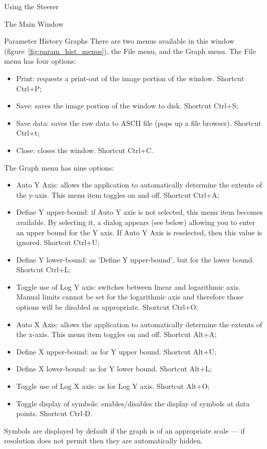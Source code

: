 \documentclass[a4paper,twoside]{article}
\begin{document}
\begin{section}{Using the Steerer}
\begin{subsection}{The Main Window}
\begin{subsubsection}{Parameter History Graphs}
There are two menus available in this window
(figure~\ref{fig:param_hist_menus}), the File menu, and the Graph
menu. The File menu has four options:
\begin{itemize}
\item Print: requests a print-out of the image portion of the window. 
Shortcut Ctrl+P;
\item Save: saves the image portion of the window to disk. Shortcut Ctrl+S;
\item Save data: saves the raw data to ASCII file (pops up a file browser). 
Shortcut Ctrl+t;
\item Close: closes the window. Shortcut Ctrl+C.
\end{itemize}
The Graph menu has nine options:
\begin{itemize}
\item Auto Y Axis: allows the application to automatically determine 
the extents of the y-axis. This menu item toggles on and off. 
Shortcut Ctrl+A;
\item Define Y upper-bound: if Auto Y axis is not selected, this 
menu item becomes available. By selecting it, a dialog appears 
(see below) allowing you to enter an upper bound for the Y axis. 
If Auto Y Axis is reselected, then this value is ignored. 
Shortcut Ctrl+U;
\item Define Y lower-bound: as 'Define Y upper-bound', but for 
the lower bound. Shortcut Ctrl+L;
\item Toggle use of Log Y axis: switches between linear and 
logarithmic axis.  Manual limits cannot be set for the logarithmic 
axis and therefore those options will be disabled as appropriate. 
Shortcut Ctrl+O;
\item Auto X Axis: allows the application to automatically 
determine the extents of the x-axis. This menu item toggles on and 
off. Shortcut Alt+A;
\item Define X upper-bound: as for Y upper bound. Shortcut Alt+U;
\item Define X lower-bound: as for Y lower bound. Shortcut Alt+L;
\item Toggle use of Log X axis:	as for Log Y axis. Shortcut Alt+O;
\item Toggle display of symbols: enables/disables the display of 
symbols at data points. Shortcut Ctrl-D.
\end{itemize}
Symbols are displayed by default if the graph is of an appropriate
scale --- if resolution does not permit then they are automatically
hidden.


\end{subsubsection}
\end{subsection}
\end{section}
\end{document}
